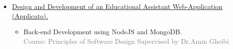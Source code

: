 \documentclass[10pt,a4paper,sans]{moderncv} %
\begin{document}
\begin{itemize}

				
		\item \href{https://gitlab.com/applicato/back-end}{Design and Development of an Educational Assistant Web-Application (Applicato).}
		\begin{itemize}
			\item Back-end Development using NodeJS and MongoDB.\\
			\textcolor{gray}{Course: Principles of Software Design Supervised by Dr.Amin Gheibi}
		\end{itemize}
	
		
	\end{itemize}
	

\end{document}
